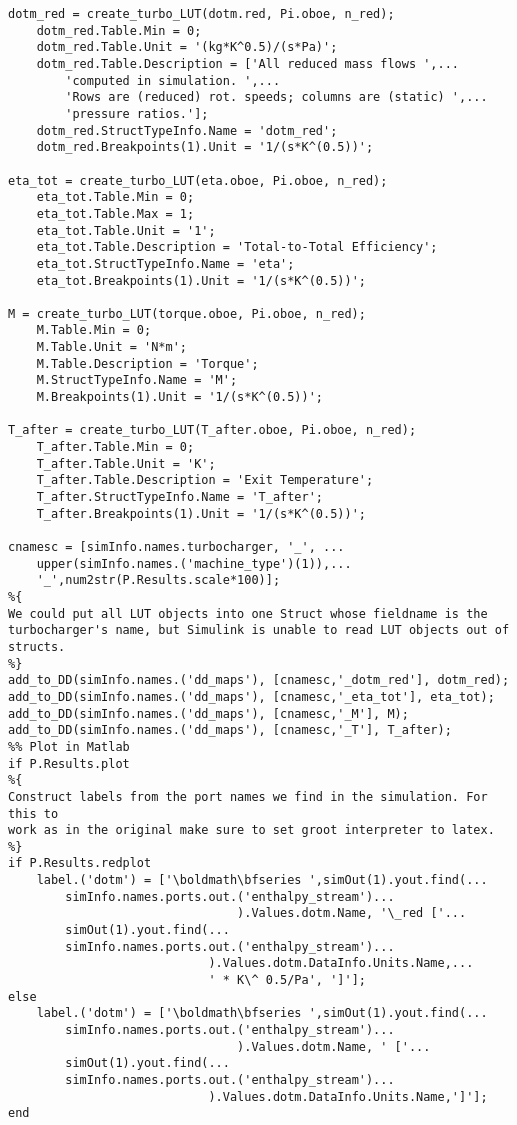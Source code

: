 \begin{lstlisting}
dotm_red = create_turbo_LUT(dotm.red, Pi.oboe, n_red);    
    dotm_red.Table.Min = 0;
    dotm_red.Table.Unit = '(kg*K^0.5)/(s*Pa)';
    dotm_red.Table.Description = ['All reduced mass flows ',...
        'computed in simulation. ',...
        'Rows are (reduced) rot. speeds; columns are (static) ',...
        'pressure ratios.'];
    dotm_red.StructTypeInfo.Name = 'dotm_red';
    dotm_red.Breakpoints(1).Unit = '1/(s*K^(0.5))';

eta_tot = create_turbo_LUT(eta.oboe, Pi.oboe, n_red);
    eta_tot.Table.Min = 0;
    eta_tot.Table.Max = 1;
    eta_tot.Table.Unit = '1';
    eta_tot.Table.Description = 'Total-to-Total Efficiency';
    eta_tot.StructTypeInfo.Name = 'eta';
    eta_tot.Breakpoints(1).Unit = '1/(s*K^(0.5))';

M = create_turbo_LUT(torque.oboe, Pi.oboe, n_red);
    M.Table.Min = 0;
    M.Table.Unit = 'N*m';
    M.Table.Description = 'Torque';
    M.StructTypeInfo.Name = 'M';
    M.Breakpoints(1).Unit = '1/(s*K^(0.5))';

T_after = create_turbo_LUT(T_after.oboe, Pi.oboe, n_red);    
    T_after.Table.Min = 0;
    T_after.Table.Unit = 'K';
    T_after.Table.Description = 'Exit Temperature';
    T_after.StructTypeInfo.Name = 'T_after';           
    T_after.Breakpoints(1).Unit = '1/(s*K^(0.5))';

cnamesc = [simInfo.names.turbocharger, '_', ...
    upper(simInfo.names.('machine_type')(1)),...
    '_',num2str(P.Results.scale*100)];
%{
We could put all LUT objects into one Struct whose fieldname is the
turbocharger's name, but Simulink is unable to read LUT objects out of
structs.
%}
add_to_DD(simInfo.names.('dd_maps'), [cnamesc,'_dotm_red'], dotm_red);
add_to_DD(simInfo.names.('dd_maps'), [cnamesc,'_eta_tot'], eta_tot);
add_to_DD(simInfo.names.('dd_maps'), [cnamesc,'_M'], M);
add_to_DD(simInfo.names.('dd_maps'), [cnamesc,'_T'], T_after);
%% Plot in Matlab
if P.Results.plot
%{
Construct labels from the port names we find in the simulation. For this to
work as in the original make sure to set groot interpreter to latex.
%}
if P.Results.redplot
    label.('dotm') = ['\boldmath\bfseries ',simOut(1).yout.find(...
        simInfo.names.ports.out.('enthalpy_stream')...
                                ).Values.dotm.Name, '\_red ['...
        simOut(1).yout.find(...
        simInfo.names.ports.out.('enthalpy_stream')...
                            ).Values.dotm.DataInfo.Units.Name,...
                            ' * K\^ 0.5/Pa', ']'];
else
    label.('dotm') = ['\boldmath\bfseries ',simOut(1).yout.find(...
        simInfo.names.ports.out.('enthalpy_stream')...
                                ).Values.dotm.Name, ' ['...
        simOut(1).yout.find(...
        simInfo.names.ports.out.('enthalpy_stream')...
                            ).Values.dotm.DataInfo.Units.Name,']'];
end


\end{lstlisting}
